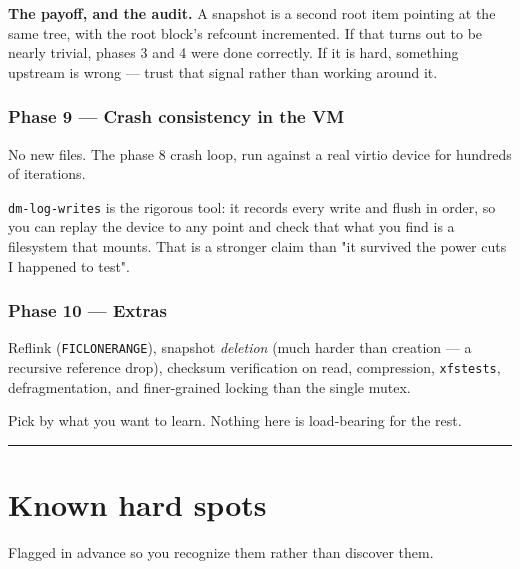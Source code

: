 \textbf{The payoff, and the audit.} A snapshot is a second root item pointing at
the same tree, with the root block's refcount incremented. If that turns out to
be nearly trivial, phases 3 and 4 were done correctly. If it is hard, something
upstream is wrong --- trust that signal rather than working around it.

\subsubsection{Phase 9 --- Crash consistency in the VM}

No new files. The phase 8 crash loop, run against a real virtio device for
hundreds of iterations.

\texttt{dm-log-writes} is the rigorous tool: it records every write and flush
in order, so you can replay the device to any point and check that what you
find is a filesystem that mounts. That is a stronger claim than "it survived
the power cuts I happened to test".

\subsubsection{Phase 10 --- Extras}

Reflink (\texttt{FICLONERANGE}), snapshot \emph{deletion} (much harder than
creation --- a recursive reference drop), checksum verification on read,
compression, \texttt{xfstests}, defragmentation, and finer-grained locking than
the single mutex.

Pick by what you want to learn. Nothing here is load-bearing for the rest.

\begin{center}\rule{0.5\linewidth}{0.5pt}\end{center}

\hypertarget{known-hard-spots}{%
\section{Known hard spots}\label{known-hard-spots}}

Flagged in advance so you recognize them rather than discover them.

